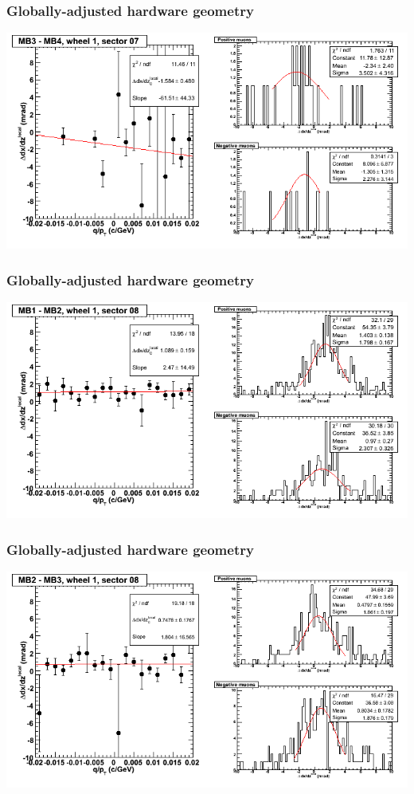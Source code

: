 \documentclass[compress]{beamer}
\begin{document}
\begin{frame}
\frametitle{Globally-adjusted hardware geometry}
\includegraphics[width=\linewidth]{NOV4_segdiffs_HW/dt13_slope_D_07_34.png}
\end{frame}

\begin{frame}
\frametitle{Globally-adjusted hardware geometry}
\includegraphics[width=\linewidth]{NOV4_segdiffs_HW/dt13_slope_D_08_12.png}
\end{frame}

\begin{frame}
\frametitle{Globally-adjusted hardware geometry}
\includegraphics[width=\linewidth]{NOV4_segdiffs_HW/dt13_slope_D_08_23.png}
\end{frame}
\end{document}
